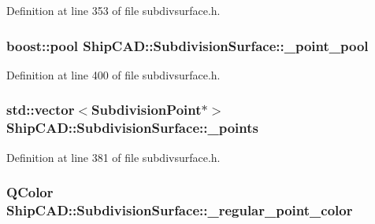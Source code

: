 Definition at line 353 of file subdivsurface.\-h.

\hypertarget{classShipCAD_1_1SubdivisionSurface_a98af3f1b9fa4412756cadf4fe561f062}{
\subsubsection[{\-\_\-point\-\_\-pool}]{\setlength{\rightskip}{0pt plus 5cm}boost\-::pool Ship\-C\-A\-D\-::\-Subdivision\-Surface\-::\-\_\-point\-\_\-pool\hspace{0.3cm}{\ttfamily [protected]}}}\label{classShipCAD_1_1SubdivisionSurface_a98af3f1b9fa4412756cadf4fe561f062}


Definition at line 400 of file subdivsurface.\-h.

\hypertarget{classShipCAD_1_1SubdivisionSurface_ab03b7f4694a63eeb3ebb831484cb1bff}{
\subsubsection[{\-\_\-points}]{\setlength{\rightskip}{0pt plus 5cm}std\-::vector$<${\bf Subdivision\-Point}$\ast$$>$ Ship\-C\-A\-D\-::\-Subdivision\-Surface\-::\-\_\-points\hspace{0.3cm}{\ttfamily [protected]}}}\label{classShipCAD_1_1SubdivisionSurface_ab03b7f4694a63eeb3ebb831484cb1bff}


Definition at line 381 of file subdivsurface.\-h.

\hypertarget{classShipCAD_1_1SubdivisionSurface_afee1585e376c34aa9b3be47f3a174cdb}{
\subsubsection[{\-\_\-regular\-\_\-point\-\_\-color}]{\setlength{\rightskip}{0pt plus 5cm}Q\-Color Ship\-C\-A\-D\-::\-Subdivision\-Surface\-::\-\_\-regular\-\_\-point\-\_\-color\hspace{0.3cm}{\ttfamily [protected]}}}\label{classShipCAD_1_1SubdivisionSurface_afee1585e376c34aa9b3be47f3a174cdb}


